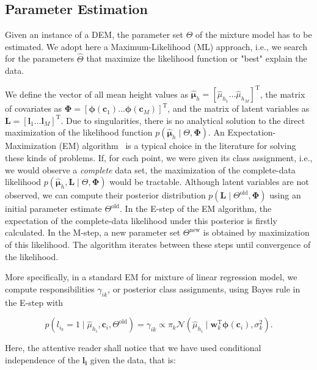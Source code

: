 \subsection{Parameter Estimation}

Given an instance of a DEM, the parameter set $\Theta$ of the mixture model has
to be estimated. We adopt here a Maximum-Likelihood (ML) approach, i.e., we
search for the parameters $\hat{\Theta}$ that maximize the likelihood function
or "best" explain the data.

We define the vector of all mean height values as $\hat{\boldsymbol\mu}_h=
[\hat{\mu}_{h_1}\dots\hat{\mu}_{h_M}]^\text{T}$, the matrix of covariates as
$\boldsymbol{\Phi}=[\boldsymbol{\phi}(\mathbf{c}_1)\dots\boldsymbol{\phi}
(\mathbf{c}_{M})]^\text{T}$, and the matrix of latent variables as
$\mathbf{L}=[\mathbf{l}_1\dots\mathbf{l}_M]^\text{T}$. Due to singularities,
there is no analytical solution to the direct maximization of the likelihood
function $p(\hat{\boldsymbol\mu}_h\mid\Theta,\boldsymbol{\Phi})$. An
Expectation-Maximization (EM) algorithm~\cite{dempster77maximum} is a typical
choice in the literature for solving these kinds of problems. If, for each
point, we were given its class assignment, i.e., we would observe a
\emph{complete} data set, the maximization of the complete-data likelihood
$p(\hat{\boldsymbol\mu}_h,\mathbf{L}\mid\Theta,\boldsymbol{\Phi})$ would be
tractable. Although latent variables are not observed, we can compute their
posterior distribution $p(\mathbf{L}\mid\Theta^\text{old},\boldsymbol{\Phi})$
using an initial parameter estimate $\Theta^\text{old}$. In the E-step of the
EM algorithm, the expectation of the complete-data likelihood under this
posterior is firstly calculated. In the M-step, a new parameter set
$\Theta^\text{new}$ is obtained by maximization of this likelihood.
The algorithm iterates between these steps until convergence of the likelihood.

More specifically, in a standard EM for mixture of linear regression model, we
compute responsibilities $\gamma_{ik}$, or posterior class assignments, using
Bayes rule in the E-step with

\begin{equation}
\label{eqn:responsibility}
p(l_{i_k}=1\mid\hat{\mu}_{h_i},\mathbf{c}_i,\Theta^\text{old})=\gamma_{ik}
\propto\pi_k\mathcal{N}(\hat{\mu}_{h_i}\mid\mathbf{w}_k^\text{T}
\boldsymbol{\phi}(\mathbf{c}_i),\sigma^2_k).
\end{equation}

Here, the attentive reader shall notice that we have used conditional
independence of the $\mathbf{l_i}$ given the data, that is:

